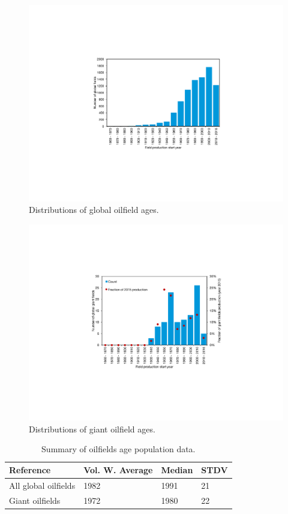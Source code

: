 \documentclass[11pt]{report}
\begin{document}
\begin{figure}[t]
\includegraphics[width=0.85\columnwidth]{images/age_distribution_all.pdf}
\caption{Distributions of global oilfield ages.}
\label{fig:age_distribution_all}
\end{figure}

\begin{figure}[t]
\includegraphics[width=0.85\columnwidth]{images/age_distribution_giant.pdf}
\caption{Distributions of giant oilfield ages.}
\label{fig:age_distribution_giant}
\end{figure}

\begin{table}
\begin{scriptsize}
\caption{Summary of oilfields age population data.}
\label{tab:oilfield_age}
\begin{tabular*}{0.8\columnwidth}{p{}p{}p{}p{}}
\toprule
Reference & Vol. W. Average & Median & STDV \\
\midrule
All global oilfields & 1982 & 1991 & 21 \\
Giant oilfields & 1972 & 1980 & 22 \\
\bottomrule
\end{tabular*}
\end{scriptsize}
\end{table}
\end{document}
